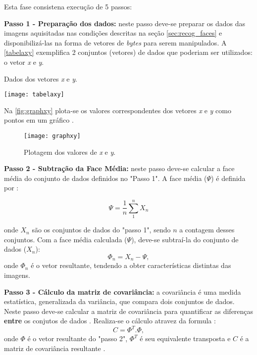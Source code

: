Esta fase consistena execução de 5 passos:

\textbf{Passo 1 - Preparação dos dados:}  neste passo deve-se preparar os dados das imagens aquisitadas nas condições descritas na seção \autoref{sec:recog_faces} e disponibilizá-las na forma de vetores de \textit{bytes} para serem manipulados. A \autoref{tabelaxy} exemplifica 2 conjuntos (vetores) de dados que poderiam ser utilizados: o vetor \textit{x} e \textit{y}.

\begin{table}[h]
	\centering
	\caption{Dados dos vetores \textit{x} e \textit{y}.}
	\texttt{[image: tabelaxy]}
	\label{tabelaxy}
\end{table}

Na \autoref{fig:graphxy} plota-se os valores correspondentes dos vetores \textit{x} e \textit{y} como pontos em um gráfico \cite{drmathew_java_programming}.


\begin{figure}[h]
	\centering
	\texttt{[image: graphxy]}
	\caption{Plotagem dos valores de \textit{x} e \textit{y}.}
	\label{fig:graphxy}
\end{figure}

\textbf{Passo 2 - Subtração da Face Média:} neste passo deve-se calcular a face média do conjunto de dados definidos no "Passo 1". A face média ($\Psi$) é definida por :

\begin{equation} 
	\Psi = \frac{1}{n} \sum_{1}^{n} X_n
\end{equation}


onde $X_n$ são os conjuntos de dados do "passo 1", sendo $n$ a contagem desses conjuntos. Com a face média calculada  ($\Psi$), deve-se subtraí-la do conjunto de dados ($X_n$):
\begin{equation}
	\Phi_n = X_n - \Psi,
\end{equation}
onde $\Phi_n$ é o vetor resultante, tendendo a obter características distintas das imagens. 

\textbf{Passo 3 - Cálculo da matriz de covariância:} a covariância é uma medida estatística, generalizada da variância, que compara dois conjuntos de dados. Neste passo deve-se calcular a matriz de covariância para quantificar as diferenças \textbf{entre} os conjutos de dados \cite{drmathew_java_programming}.  Realiza-se o cálculo atravez da formula \cite{geysilva}: 
\begin{equation}
	C = \Phi^T . \Phi,	
\end{equation}
onde $\Phi$ é o vetor resultante do "passo 2", $\Phi^T$ é seu equivalente transposta e $C$ é a matriz de covariância resultante \cite{geysilva}.

